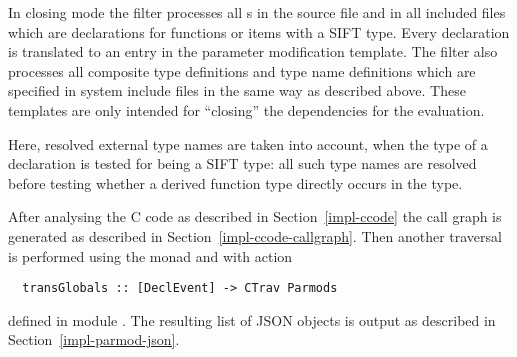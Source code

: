 In closing mode the filter processes all s in the source file and in all included files which
are declarations for functions or items with a SIFT type. Every declaration is translated to an entry in the parameter
modification template. The filter also processes all composite type definitions and type name definitions which
are specified in system include files in the same way as described above. 
These templates are only intended for ``closing'' the dependencies for the evaluation.

Here, resolved external type names are taken into account, when the type of a declaration is tested for 
being a SIFT type: all such type names are resolved before testing whether a derived function type directly
occurs in the type.

After analysing the C code as described in Section~\ref{impl-ccode} the call graph is generated as described
in Section~\ref{impl-ccode-callgraph}. Then another traversal is performed using the  monad and
 with action
\begin{verbatim}
  transGlobals :: [DeclEvent] -> CTrav Parmods
\end{verbatim}
defined in module . The resulting list of JSON objects is output as described 
in Section~\ref{impl-parmod-json}.

